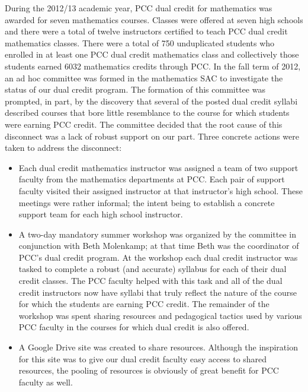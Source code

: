 During the 2012/13 academic year, PCC dual credit for mathematics was awarded
for seven mathematics courses.  Classes were offered at seven high schools and
there were a total of twelve instructors certified to teach PCC dual credit
mathematics classes.  There were a total of 750 unduplicated students who
enrolled in at least one PCC dual credit mathematics class and collectively
those students earned 6032 mathematics credits through PCC.
In the fall term of 2012, an ad hoc committee was formed in the mathematics SAC to investigate the status of our dual credit program.  The formation of this committee was prompted, in part, by the discovery that several of the posted dual credit syllabi described courses that bore little resemblance to the course for which students were earning PCC credit.  The committee decided that the root cause of this disconnect was a lack of robust support on our part.  Three concrete actions were taken to address the disconnect:
\begin{itemize}
\item Each dual credit mathematics instructor was assigned a team of two support
  faculty from the mathematics departments at PCC.  Each pair of support faculty
  visited their assigned instructor at that instructor's high school.  These
  meetings were rather informal; the intent being to establish a concrete
  support team for each high school instructor.
\item A two-day mandatory summer workshop was organized by the committee in
  conjunction with Beth Molenkamp; at that time Beth was the coordinator of
  PCC's dual credit program.  At the workshop each dual credit instructor was
  tasked to complete a robust (and accurate) syllabus for each of their dual
  credit classes.  The PCC faculty helped with this task and all of the dual
  credit instructors now have syllabi that truly reflect the nature of the
  course for which the students are earning PCC credit.  The remainder of the
  workshop was spent sharing resources and pedagogical tactics used by various
  PCC faculty in the courses for which dual credit is also offered.
\item A Google Drive site was created to share resources.  Although the
  inspiration for this site was to give our dual credit faculty easy access to
  shared resources, the pooling of resources is obviously of great benefit for
  PCC faculty as well.
\end{itemize}


